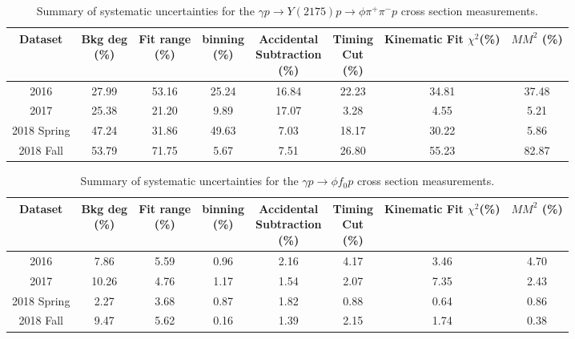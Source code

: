\begin{table}[!htbp]
    \small
    \centering
    \caption{Summary of systematic uncertainties for the $\gamma p \rightarrow Y(2175) p \rightarrow \phi \pi^{+} \pi^{-} p$ cross section measurements.}
    \label{tab.y2175.syserr.yphi2pi.1.1}
    \begin{tabular}{|c|c|c|c|c|c|c|c|}
        \hline
        Dataset&\thead{Bkg deg\\(\%)}&\thead{Fit range\\(\%)}&\thead{binning\\(\%)}&\thead{Accidental\\Subtraction\\(\%)}&\thead{Timing\\Cut\\(\%)}&\thead{Kinematic\\Fit $\chi^{2}$(\%)}&\thead{$MM^{2}$\\(\%)}\\
        \hline
        2016 & 27.99 & 53.16 & 25.24 & 16.84 & 22.23 & 34.81 & 37.48 \\ 
        2017 & 25.38 & 21.20 & 9.89 & 17.07 & 3.28 & 4.55 & 5.21 \\ 
        2018 Spring & 47.24 & 31.86 & 49.63 & 7.03 & 18.17 & 30.22 & 5.86 \\ 
        2018 Fall & 53.79 & 71.75 & 5.67 & 7.51 & 26.80 & 55.23 & 82.87 \\
        \hline
    \end{tabular}
\end{table}

\begin{table}[!htbp]
    \small
    \centering
    \caption{Summary of systematic uncertainties for the $\gamma p \rightarrow \phi f_{0} p$ cross section measurements.}
    \label{tab.y2175.syserr.phifo.1.1}
    \begin{tabular}{|c|c|c|c|c|c|c|c|}
        \hline
        Dataset&\thead{Bkg deg\\(\%)}&\thead{Fit range\\(\%)}&\thead{binning\\(\%)}&\thead{Accidental\\Subtraction\\(\%)}&\thead{Timing\\Cut\\(\%)}&\thead{Kinematic\\Fit $\chi^{2}$(\%)}&\thead{$MM^{2}$\\(\%)}\\
        \hline
        2016 & 7.86 & 5.59 & 0.96 & 2.16 & 4.17 & 3.46 & 4.70 \\ 
        2017 & 10.26 & 4.76 & 1.17 & 1.54 & 2.07 & 7.35 & 2.43 \\ 
        2018 Spring & 2.27 & 3.68 & 0.87 & 1.82 & 0.88 & 0.64 & 0.86 \\ 
        2018 Fall & 9.47 & 5.62 & 0.16 & 1.39 & 2.15 & 1.74 & 0.38 \\
        \hline
    \end{tabular}
\end{table}

